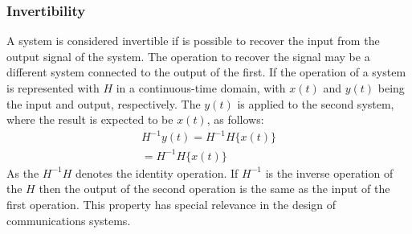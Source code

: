 \subsubsection*{Invertibility}
A system is considered invertible if is possible to recover the input from the output signal of the system. The operation to recover the signal may be a different system connected to the output of the first. If the operation of a system is represented with $H$ in a continuous-time domain, with $x(t)$ and $y(t)$ being the input and output, respectively. The $y(t)$ is applied to the second system, where the result is expected to be $x(t)$, as follows:
\begin{equation}
    \begin{aligned}
        H^{-1}{y(t)} = H^{-1}{H\{x(t)\}}\\
        = H^{-1}H\{x(t)\}    
    \end{aligned}
\end{equation} 
As the $H^{-1}H$ denotes the identity operation. If $H^{-1}$ is the inverse operation of the $H$ then the output of the second operation is the same as the input of the first operation. This property has special relevance in the design of communications systems. 

